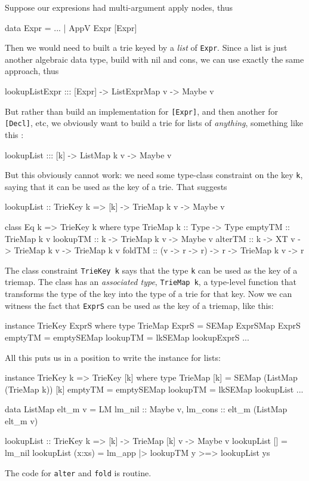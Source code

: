 \documentclass[acmsmall]{acmart}
\theoremstyle{theorem}
\theoremstyle{definition}
\theoremstyle{remark}
\begin{document}
Suppose our expresions had multi-argument apply nodes, thus
\begin{code}
data Expr = ...
          | AppV Expr [Expr]
\end{code}
Then we would need to built a trie keyed by a \emph{list} of \lstinline{Expr}.
Since a list is just another algebraic data type, build with nil and cons,
we can use exactly the same approach, thus
\begin{code}
lookupListExpr ::: [Expr] -> ListExprMap v -> Maybe v
\end{code}
But rather than build an implementation
for \lstinline{[Expr]}, and then another for \lstinline{[Decl]}, etc, we obviously
want to build a trie for lists of \emph{anything}, something like this \cite{hinze}:
\begin{code}
lookupList ::: [k] -> ListMap k v -> Maybe v
\end{code}
But this obviously cannot work: we need some type-class constraint on the key \lstinline{k},
saying that it can be used as the key of a trie.   That suggests
\begin{code}
lookupList :: TrieKey k => [k] -> TrieMap k v -> Maybe v

class Eq k => TrieKey k where
  type TrieMap k :: Type -> Type
  emptyTM  :: TrieMap k v
  lookupTM :: k -> TrieMap k v -> Maybe v
  alterTM  :: k -> XT v -> TrieMap k v -> TrieMap k v
  foldTM   :: (v -> r -> r) -> r -> TrieMap k v -> r
\end{code}
The class constraint \lstinline{TrieKey k} says that the type \lstinline{k}
can be used as the key of a triemap.
The class has an \emph{associated type}, \lstinline{TrieMap k},
a type-level function that transforms the type of the key into
the type of a trie for that key.  Now we can witness the fact that \lstinline{ExprS} can be
used as the key of a triemap, like this:
\begin{code}
instance TrieKey ExprS where
  type TrieMap ExprS = SEMap ExprSMap ExprS
  emptyTM  = emptySEMap
  lookupTM = lkSEMap lookupExprS
  ...
\end{code}
All this puts us in a position to write the instance for lists:
\begin{code}
instance TrieKey k => TrieKey [k] where
  type TrieMap [k] = SEMap (ListMap (TrieMap k)) [k]
  emptyTM  = emptySEMap
  lookupTM = lkSEMap lookupList
  ...

data ListMap elt_m v = LM { lm_nil  :: Maybe v, lm_cons :: elt_m (ListMap elt_m  v) }

lookupList :: TrieKey k => [k] -> TrieMap [k] v -> Maybe v
lookupList []     = lm_nil
lookupList (x:xs) = lm_app |> lookupTM y >=> lookupList ys
\end{code}
The code for \lstinline{alter} and \lstinline{fold} is routine.
\end{document}
